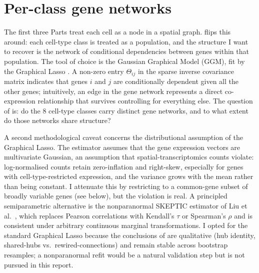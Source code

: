 \section{Per-class gene networks}
\label{sec:part4}

The first three Parts treat each cell as a node in a spatial graph.  flips this around: each cell-type class is treated as a population, and the structure I want to recover is the network of conditional dependencies between genes within that population. The tool of choice is the Gaussian Graphical Model (GGM), fit by the Graphical Lasso \cite{friedman2008glasso}. A non-zero entry $\Theta_{ij}$ in the sparse inverse covariance matrix indicates that genes $i$ and $j$ are conditionally dependent given all the other genes; intuitively, an edge in the gene network represents a direct co-expression relationship that survives controlling for everything else. The question of  is: do the 8 cell-type classes carry distinct gene networks, and to what extent do those networks share structure?

A second methodological caveat concerns the distributional assumption of the Graphical Lasso. The estimator assumes that the gene expression vectors are multivariate Gaussian, an assumption that spatial-transcriptomics counts violate: log-normalised counts retain zero-inflation and right-skew, especially for genes with cell-type-restricted expression, and the variance grows with the mean rather than being constant. I attenuate this by restricting to a common-gene subset of broadly variable genes (see below), but the violation is real. A principled semiparametric alternative is the nonparanormal SKEPTIC estimator of Liu et al.\ \cite{liu2012nonparanormal}, which replaces Pearson correlations with Kendall's $\tau$ or Spearman's $\rho$ and is consistent under arbitrary continuous marginal transformations. I opted for the standard Graphical Lasso because the conclusions of  are qualitative (hub identity, shared-hubs vs.\ rewired-connections) and remain stable across bootstrap resamples; a nonparanormal refit would be a natural validation step but is not pursued in this report.

